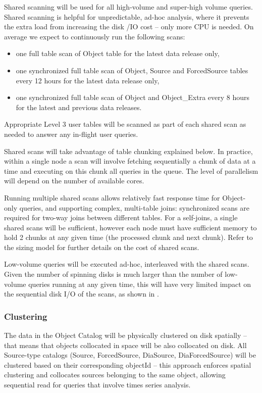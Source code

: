 \documentclass[DM,lsstdraft,toc]{lsstdoc}
\begin{document}
Shared scanning will be used for all high-volume and super-high volume
queries. Shared scanning is helpful for unpredictable, ad-hoc analysis,
where it prevents the extra load from increasing the disk /IO cost --
only more CPU is needed. On average we expect to continuously run the
following scans:

\begin{itemize}
\item
  one full table scan of Object table for the latest data release only,
\item
  one synchronized full table scan of Object, Source and ForcedSource
  tables every 12 hours for the latest data release only,
\item
  one synchronized full table scan of Object and Object\_Extra every 8
  hours for the latest and previous data releases.
\end{itemize}

Appropriate Level 3 user tables will be scanned as part of each shared
scan as needed to answer any in-flight user queries.

Shared scans will take advantage of table chunking explained below. In
practice, within a single node a scan will involve fetching sequentially
a chunk of data at a time and executing on this chunk all queries in the
queue. The level of parallelism will depend on the number of available
cores.

Running multiple shared scans allows relatively fast response time for
Object-only queries, and supporting complex, multi-table joins:
synchronized scans are required for two-way joins between different
tables. For a self-joins, a single shared scans will be sufficient,
however each node must have sufficient memory to hold 2 chunks at any
given time (the processed chunk and next chunk). Refer to the sizing
model  for further details on the cost of shared scans.

Low-volume queries will be executed ad-hoc, interleaved with the shared
scans. Given the number of spinning disks is much larger than the number
of low-volume queries running at any given time, this will have very
limited impact on the sequential disk I/O of the scans, as shown in
.

\subsubsection{Clustering}\label{clustering}

The data in the Object Catalog will be physically clustered on disk
spatially -- that means that objects collocated in space will be also
collocated on disk. All Source-type catalogs (Source, ForcedSource,
DiaSource, DiaForcedSource) will be clustered based on their
corresponding objectId -- this approach enforces spatial clustering and
collocates sources belonging to the same object, allowing sequential
read for queries that involve times series analysis.
\end{document}

